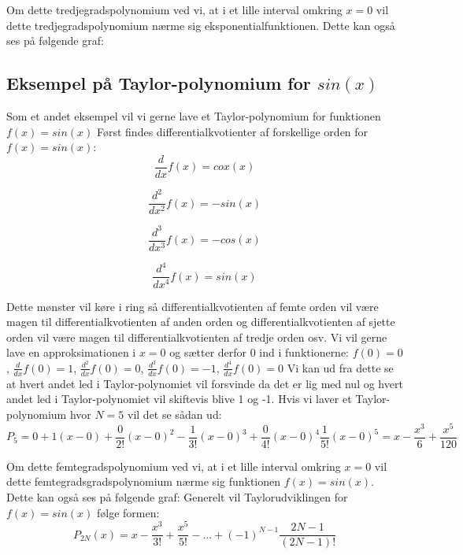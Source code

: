 Om dette tredjegradspolynomium ved vi, at i et lille interval omkring $x=0$ vil dette tredjegradspolynomium nærme sig eksponentialfunktionen. Dette kan også ses på følgende graf:

\subsection*{Eksempel på Taylor-polynomium for $sin(x)$}
Som et andet eksempel vil vi gerne lave et Taylor-polynomium for funktionen $f(x)=sin(x)$ Først findes differentialkvotienter af forskellige orden for $f(x)=sin(x)$:
\[
\frac{d}{dx}f(x)=cox(x)       
\]

\[
\frac{d^2}{dx^2}f(x)=-sin(x)
\]

\[
\frac{d^3}{dx^3}f(x)=-cos(x)
\]

\[
\frac{d^4}{dx^4}f(x)=sin(x)
\]

Dette mønster vil køre i ring så differentialkvotienten af femte orden vil være magen til differentialkvotienten af anden orden og differentialkvotienten af sjette orden vil være magen til differentialkvotienten af tredje orden osv. Vi vil gerne lave en approksimationen i $x=0$ og sætter derfor 0 ind i funktionerne:
$f(0)=0$, $\frac{d}{dx}f(0)=1$,  $\frac{d^2}{dx}f(0)=0$,                     $\frac{d^3}{dx}f(0)=-1$,    $\frac{d^4}{dx}f(0)=0$
Vi kan ud fra dette se at hvert andet led i Taylor-polynomiet vil forsvinde da det er lig med nul og hvert andet led i Taylor-polynomiet vil skiftevis blive 1 og -1. Hvis vi laver et Taylor-polynomium hvor $N=5$ vil det se sådan ud:
\[
P_5=0+1(x-0)+\frac{0}{2!}(x-0)^2-\frac{1}{3!}(x-0)^3+\frac{0}{4!}(x-0)^4\frac{1}{5!}(x-0)^5=x-\frac{x^3}{6}+\frac{x^5}{120}
\]

Om dette femtegradspolynomium ved vi, at i et lille interval omkring $x=0$ vil dette femtegradsgradspolynomium nærme sig funktionen $f(x)=sin(x)$. Dette kan også ses på følgende graf:
Generelt vil Taylorudviklingen for $f(x)=sin(x)$ følge formen:
\[
P_{2N}(x)=x-\frac{x^3}{3!}+\frac{x^5}{5!}-...+(-1)^{N-1}\frac{2N-1}{(2N-1)!}
\]



